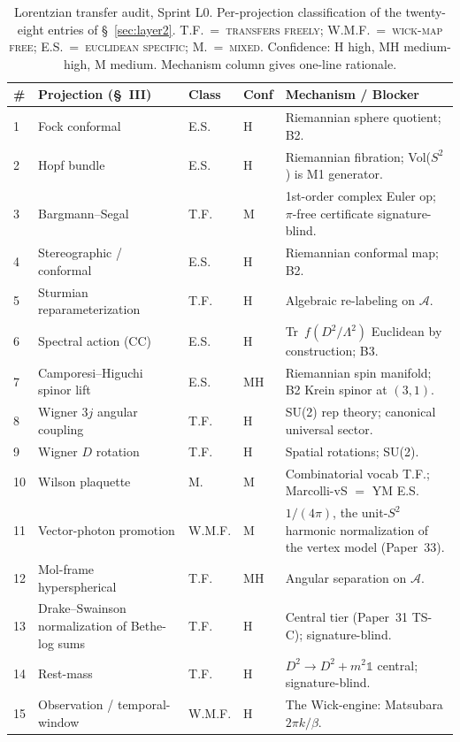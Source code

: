\documentclass[11pt]{article}
\begin{document}
\begin{table}[h]
\centering\footnotesize
\caption{Lorentzian transfer audit, Sprint L0.  Per-projection
classification of the twenty-eight entries of \S~\ref{sec:layer2}.
T.F.~=~\textsc{transfers freely}; W.M.F.~=~\textsc{wick-map free};
E.S.~=~\textsc{euclidean specific}; M.~=~\textsc{mixed}.  Confidence:
H high, MH medium-high, M medium.  Mechanism column gives one-line
rationale.}
\label{tab:lorentzian_transfer}
\begin{tabular}{p{0.4cm} p{4.3cm} p{0.8cm} p{0.5cm} p{8cm}}
\toprule
\# & Projection (\S~III) & Class & Conf & Mechanism / Blocker \\
\midrule
1 & Fock conformal & E.S. & H & Riemannian sphere quotient; B2. \\
2 & Hopf bundle & E.S. & H & Riemannian fibration; Vol($S^2$) is M1 generator. \\
3 & Bargmann--Segal & T.F. & M & 1st-order complex Euler op; $\pi$-free certificate signature-blind. \\
4 & Stereographic / conformal & E.S. & H & Riemannian conformal map; B2. \\
5 & Sturmian reparameterization & T.F. & H & Algebraic re-labeling on $\mathcal{A}$. \\
6 & Spectral action (CC) & E.S. & H & Tr~$f(D^2/\Lambda^2)$ Euclidean by construction; B3. \\
7 & Camporesi--Higuchi spinor lift & E.S. & MH & Riemannian spin manifold; B2 Krein spinor at $(3,1)$. \\
8 & Wigner $3j$ angular coupling & T.F. & H & SU(2) rep theory; canonical universal sector. \\
9 & Wigner $D$ rotation & T.F. & H & Spatial rotations; SU(2). \\
10 & Wilson plaquette & M. & M & Combinatorial vocab T.F.; Marcolli-vS $=$ YM E.S. \\
11 & Vector-photon promotion & W.M.F. & M & $1/(4\pi)$, the unit-$S^2$ harmonic normalization of the vertex model (Paper~33). \\
12 & Mol-frame hyperspherical & T.F. & MH & Angular separation on $\mathcal{A}$. \\
13 & Drake--Swainson normalization of Bethe-log sums & T.F. & H & Central tier (Paper~31 TS-C); signature-blind. \\
14 & Rest-mass & T.F. & H & $D^2 \to D^2 + m^2\mathbb{1}$ central; signature-blind. \\
15 & Observation / temporal-window & W.M.F. & H & The Wick-engine: Matsubara $2\pi k/\beta$. \\

\end{tabular}
\end{table}
\end{document}
